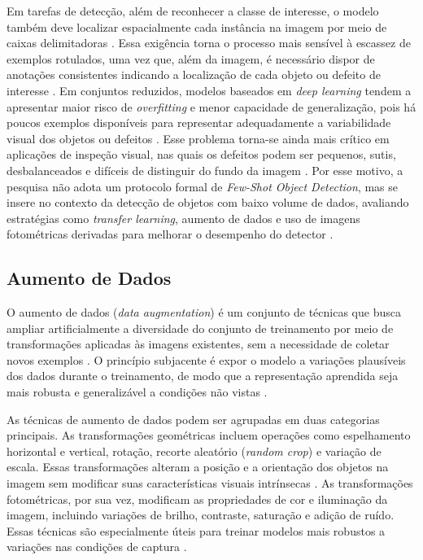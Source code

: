 \documentclass[
    12pt,                %
    openright,           %
    oneside,             %
    a4paper,             %
    english,             %
    brazil               %
]{abntex2}
\begin{document}
Em tarefas de detecção, além de reconhecer a classe de interesse,
o modelo também deve localizar espacialmente cada instância na imagem
por meio de caixas delimitadoras \cite{Ramos2025}. Essa exigência torna
o processo mais sensível à escassez de exemplos rotulados, uma vez que,
além da imagem, é necessário dispor de anotações consistentes indicando
a localização de cada objeto ou defeito de interesse \cite{Situ2023}.
Em conjuntos reduzidos, modelos baseados em \textit{deep learning}
tendem a apresentar maior risco de \textit{overfitting} e menor
capacidade de generalização, pois há poucos exemplos disponíveis para
representar adequadamente a variabilidade visual dos objetos ou
defeitos \cite{Wang2022}. Esse problema torna-se ainda mais crítico em
aplicações de inspeção visual, nas quais os defeitos podem ser pequenos,
sutis, desbalanceados e difíceis de distinguir do fundo da imagem
\cite{Chen2021, Wang2022}. Por esse motivo, a pesquisa não adota um
protocolo formal de \textit{Few-Shot Object Detection}, mas se insere
no contexto da detecção de objetos com baixo volume de dados, avaliando
estratégias como \textit{transfer learning}, aumento de dados e uso de
imagens fotométricas derivadas para melhorar o desempenho do detector
\cite{Situ2023}.

\subsection{Aumento de Dados}
\label{subsec:data_augmentation}

O aumento de dados (\textit{data augmentation}) é um conjunto
de técnicas que busca ampliar artificialmente a diversidade
do conjunto de treinamento por meio de transformações aplicadas
às imagens existentes, sem a necessidade de coletar novos
exemplos \cite{Situ2023}. O princípio subjacente é expor
o modelo a variações plausíveis dos dados durante o treinamento,
de modo que a representação aprendida seja mais robusta e
generalizável a condições não vistas \cite{Situ2023}.

As técnicas de aumento de dados podem ser agrupadas em duas
categorias principais. As transformações geométricas incluem
operações como espelhamento horizontal e vertical, rotação,
recorte aleatório (\textit{random crop}) e variação de escala.
Essas transformações alteram a posição e a orientação dos
objetos na imagem sem modificar suas características visuais
intrínsecas \cite{Situ2023}. As transformações fotométricas,
por sua vez, modificam as propriedades de cor e iluminação
da imagem, incluindo variações de brilho, contraste, saturação
e adição de ruído. Essas técnicas são especialmente úteis
para treinar modelos mais robustos a variações nas condições
de captura \cite{Situ2023}.
\end{document}
